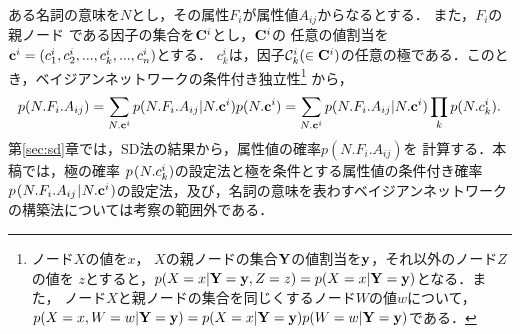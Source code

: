 ある名詞の意味を$N$\hspace{-0.1mm}とし，\hspace{-0.2mm}その属性$F_{i}$が属性値$A_{ij}$からなるとする．
また，$F_i$の親ノード
である因子の集合を${\bf C}^i$とし，${\bf C}^i$の
任意の値割当を${{\bf c}^i} = (c_1^i,c_2^i,...,c_k^i,...,c_n^i)$とする．
$c_k^i$は，因子${\cal C}_k^i (\in {\bf C}^i)$の任意の極である．このと
き，ベイジアンネットワークの条件付き独立性\footnote{ノード\hspace{-0.1mm}$X$\hspace{-0.1mm}の値を\hspace{-0.1mm}$x$\hspace{-0.1mm}，
\hspace{-0.1mm}$X$\hspace{-0.1mm}の親ノードの集合\hspace{-0.1mm}$\bf Y$\hspace{-0.1mm}の値割当を\hspace{-0.1mm}$\bf y$，\hspace{-0.1mm}それ以外のノード$Z$の値を\hspace{-0.1mm}
$z$\hspace{-0.1mm}とすると，$p(X\hspace{-0.1mm}=x|{\bf Y\hspace{-0.1mm}=y},Z\hspace{-0.1mm}=z) = p(X=x|{\bf Y = y})$となる．また，
ノード$X$と親ノードの集合を同じくするノード$W$の値$w$について，
$p(X=x,W=w|{\bf Y = y}) = p(X=x|{\bf Y = y})p(W=w|{\bf Y = y})$である．}
から，
\begin{equation}
  \label{eq:NFA}
  p(N.F_i.A_{ij}) = \sum_{N.{\bf c}^i} p(N.F_i.A_{ij}|{N.{\bf c}^i}) p(N.{\bf c}^i) = \sum_{N.{\bf c}^i} p(N.F_i.A_{ij}|N.{\bf c}^i) \prod_k p(N.c_k^i).
\end{equation}
第\ref{sec:sd}章では，SD法の結果から，属性値の確率$p(N.F_i.A_{ij})$を
計算する．本稿では，極の確率
$p\hspace{0.3mm}(\hspace{0.1mm}N.c_k^i\hspace{0.1mm})$\hspace{0.1mm}の設定法と極を条件とする属性値の条件付き確率\hspace{0.2mm}$p\hspace{0.3mm}(\hspace{0.1mm}N.F_i.A_{ij}\hspace{0.2mm}|\hspace{0.2mm}N.{\bf c}^i\hspace{0.2mm})$の設定法，\hspace{0.2mm}及び，\hspace{0.2mm}名詞の意味を表わすベイジアンネットワークの構築法については考察の範囲外である．

